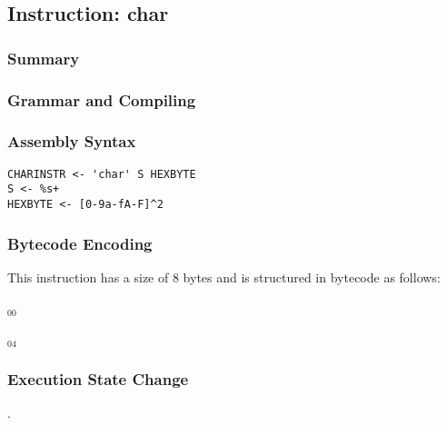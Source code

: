 \subsection{Instruction: char}

\subsubsection{Summary}


\subsubsection{Grammar and Compiling}


\subsubsection{Assembly Syntax}

\begin{myquote}
\begin{verbatim}
CHARINSTR <- 'char' S HEXBYTE
S <- %s+
HEXBYTE <- [0-9a-fA-F]^2
\end{verbatim}
\end{myquote}


\subsubsection{Bytecode Encoding}

This instruction has a size of 8 bytes and is structured in bytecode as follows:

$_{00}$\ 



$_{04}$\ 


\subsubsection{Execution State Change}

.


